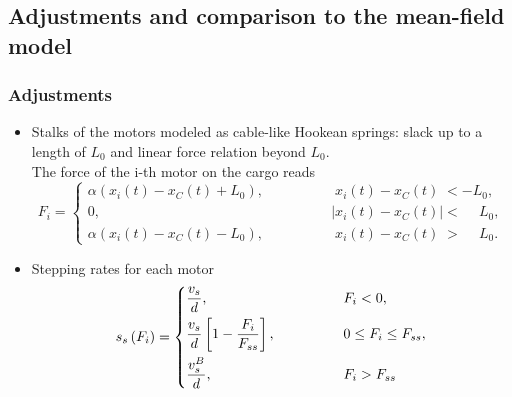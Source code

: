 \documentclass[11pt]{beamer}
\begin{document}
\subsection{Adjustments and comparison to the mean-field model}
\begin{frame}
  \frametitle{Adjustments}
  \begin{itemize}
   \item
     Stalks of the motors modeled as cable-like Hookean springs: slack up to a length of $L_0$ and linear force relation beyond $L_0$.\\ The force of the i-th motor on the cargo reads
     \begin{equation*}\label{e.motor-spring-relation}
	F_i =
	\begin{cases}
	  \alpha \left(x_i\left(t\right) - x_{C}\left(t\right) + L_0\right), \qquad & \qquad \phantom{\vert}x_i\left(t\right) - x_{C}\left(t\right) \phantom{\vert} < -L_0, \\
	  0,	& \qquad \vert x_i\left(t\right) - x_{C}\left(t\right) \vert < \phantom{-}L_0, \\
	  \alpha \left(x_i\left(t\right) - x_{C}\left(t\right) - L_0\right), \qquad & \qquad \phantom{\vert}x_i\left(t\right) - x_{C}\left(t\right) \phantom{\vert} > \phantom{-}L_0.
	\end{cases}
      \end{equation*}
     \pause
   \item
     Stepping rates for each motor
     \begin{equation*}\label{e.motor-stepping-rate}
      s_s\left(F_i\right) =
      \begin{dcases}
	\dfrac{v_s}{d}, \qquad & \qquad F_i < 0, \\
	\dfrac{v_s}{d}\left[1 - \frac{F_i}{F_{ss}}\right], \qquad & \qquad 0 \leq F_i \leq F_{ss}, \\
	\dfrac{v_s^B}{d}, \qquad & \qquad F_i > F_{ss}
      \end{dcases}
     \end{equation*}
  \end{itemize}

\end{frame}
\end{document}
